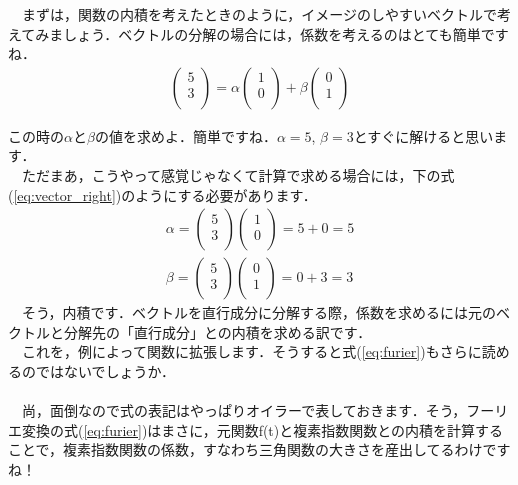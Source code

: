 \documentclass[11pt,a4paper]{ujreport} 	%
\begin{document}
　まずは，関数の内積を考えたときのように，イメージのしやすいベクトルで考えてみましょう．ベクトルの分解の場合には，係数を考えるのはとても簡単ですね．\\
\begin{eqnarray}
\left( \begin{array}{cc} 5\\ 3\\ \end{array} \right) = \alpha \left(\begin{array}{cc} 1\\ 0\\ \end{array} \right) + \beta \left( \begin{array}{cc} 0\\ 1\\ \end{array} \right)
\label{eq:vector}
\end{eqnarray}

この時の$\alpha$と$\beta$の値を求めよ．簡単ですね．$\alpha = 5$, $\beta = 3$とすぐに解けると思います．\\
　ただまあ，こうやって感覚じゃなくて計算で求める場合には，下の式(\ref{eq:vector_right})のようにする必要があります．
\begin{eqnarray}
\alpha = \left(\begin{array}{cc} 5\\ 3\\ \end{array} \right)\left(\begin{array}{cc} 1\\ 0\\ \end{array} \right) = 5+0=5 \nonumber \\
\beta =  \left(\begin{array}{cc} 5\\ 3\\ \end{array} \right)\left(\begin{array}{cc} 0\\ 1\\ \end{array} \right) =0+3=3
\label{eq:vector_right}
\end{eqnarray}
　そう，内積です．ベクトルを直行成分に分解する際，係数を求めるには元のベクトルと分解先の「直行成分」との内積を求める訳です．\\
　これを，例によって関数に拡張します．そうすると式(\ref{eq:furier})もさらに読めるのではないでしょうか．\\
\\
　尚，面倒なので式の表記はやっぱりオイラーで表しておきます．そう，フーリエ変換の式(\ref{eq:furier})はまさに，元関数f(t)と複素指数関数との内積を計算することで，複素指数関数の係数，すなわち三角関数の大きさを産出してるわけですね！\\
\end{document}
